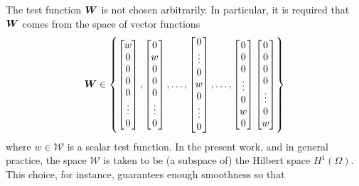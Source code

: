 The test function $\boldsymbol W$ is not chosen arbitrarily.
In particular, it is required that $\boldsymbol W$ comes from the space of
vector functions
\begin{align}
  \label{eqn:W_set}
  \boldsymbol W \in \left\{
      \begin{bmatrix}
        w \\ 0 \\ 0 \\ 0 \\ 0 \\ \vdots \\ 0
      \end{bmatrix},
      \begin{bmatrix}
        0 \\ w \\ 0 \\ 0 \\ 0 \\ \vdots \\ 0
      \end{bmatrix},
      \dots ,
      \begin{bmatrix}
        0 \\ \vdots \\ 0 \\ w \\ 0 \\ \vdots \\ 0
      \end{bmatrix},
      \dots ,
     \begin{bmatrix}
        0 \\ 0 \\ 0 \\ \vdots \\ 0 \\ w \\ 0
      \end{bmatrix}
      \begin{bmatrix}
        0 \\ 0 \\ 0 \\ 0 \\ \vdots \\ 0 \\ w
      \end{bmatrix}
    \right\}
\end{align}
where $w \in \mathcal{W}$ is a scalar test function.  In the present
work, and in general practice, the space $\mathcal{W}$ is taken to be
(a subspace of) the Hilbert space $H^1(\Omega)$. This choice, for
instance, guarantees enough smoothness so that 
